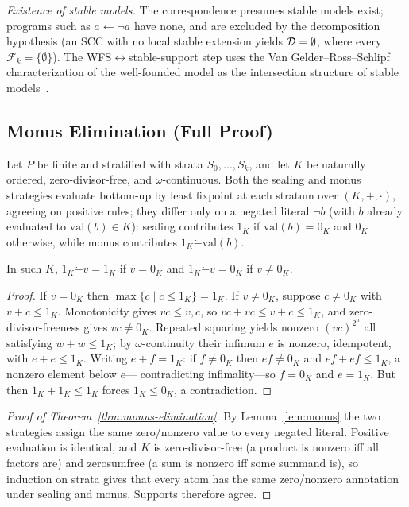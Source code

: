 \noindent
\emph{Existence of stable models.} The correspondence presumes stable models
exist; programs such as $a \leftarrow \neg a$ have none, and are excluded by
the decomposition hypothesis (an SCC with no local stable extension yields
$\mathcal{D} = \emptyset$, where every $\mathcal{F}_k = \{\emptyset\}$). The
WFS$\leftrightarrow$stable-support step uses the Van Gelder--Ross--Schlipf
characterization of the well-founded model as the intersection structure of
stable models~\cite{vanGelder1991wellFounded}.

\subsection{Monus Elimination (Full Proof)}

Let $P$ be finite and stratified with strata $S_0, \dots, S_k$, and let $K$ be
naturally ordered, zero-divisor-free, and $\omega$-continuous. Both the
sealing and monus~\cite{dannert2021semiring} strategies evaluate bottom-up by
least fixpoint at each stratum over $(K,+,\cdot)$, agreeing on positive rules;
they differ only on a negated literal $\neg b$ (with $b$ already evaluated to
$\mathrm{val}(b) \in K$): sealing contributes $1_K$ if $\mathrm{val}(b) = 0_K$
and $0_K$ otherwise, while monus contributes
$1_K \mathbin{\dot{-}} \mathrm{val}(b)$.

\begin{lemma}
  \label{lem:monus}
  In such $K$, $1_K \mathbin{\dot{-}} v = 1_K$ if $v = 0_K$ and
  $1_K \mathbin{\dot{-}} v = 0_K$ if $v \neq 0_K$.
\end{lemma}
\begin{proof}
  If $v = 0_K$ then $\max\{c \mid c \le 1_K\} = 1_K$. If $v \neq 0_K$, suppose
  $c \neq 0_K$ with $v + c \le 1_K$. Monotonicity gives $vc \le v, c$, so
  $vc + vc \le v + c \le 1_K$, and zero-divisor-freeness gives $vc \neq 0_K$.
  Repeated squaring yields nonzero $(vc)^{2^n}$ all satisfying
  $w + w \le 1_K$; by $\omega$-continuity their infimum $e$ is nonzero,
  idempotent, with $e + e \le 1_K$. Writing $e + f = 1_K$: if $f \neq 0_K$
  then $ef \neq 0_K$ and $ef + ef \le 1_K$, a nonzero element below $e$---%
  contradicting infimality---so $f = 0_K$ and $e = 1_K$. But then
  $1_K + 1_K \le 1_K$ forces $1_K \le 0_K$, a contradiction.
\end{proof}

\begin{proof}[Proof of Theorem~\ref{thm:monus-elimination}]
  By Lemma~\ref{lem:monus} the two strategies assign the same zero/nonzero
  value to every negated literal. Positive evaluation is identical, and $K$ is
  zero-divisor-free (a product is nonzero iff all factors are) and zerosumfree
  (a sum is nonzero iff some summand is), so induction on strata gives that
  every atom has the same zero/nonzero annotation under sealing and monus.
  Supports therefore agree.
\end{proof}

